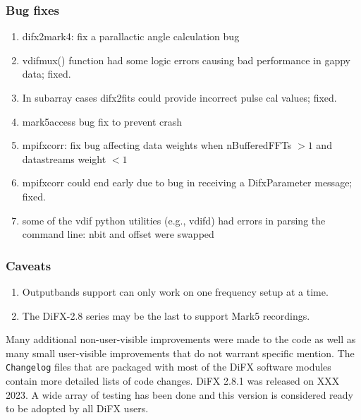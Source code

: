 \subsubsection{Bug fixes}
\begin{enumerate}
\item difx2mark4: fix a parallactic angle calculation bug
\item vdifmux() function had some logic errors causing bad performance in gappy data; fixed.
\item In subarray cases difx2fits could provide incorrect pulse cal values; fixed.
\item mark5access bug fix to prevent crash
\item mpifxcorr: fix bug affecting data weights when nBufferedFFTs $> 1$ and datastreams weight $< 1$
\item mpifxcorr could end early due to bug in receiving a DifxParameter message; fixed.
\item some of the vdif python utilities (e.g., vdifd) had errors in parsing the command line: nbit and offset were swapped
\end{enumerate}

\subsubsection{Caveats}
\begin{enumerate}
\item Outputbands support can only work on one frequency setup at a time.
\item The DiFX-2.8 series may be the last to support Mark5 recordings. 
\end{enumerate}

Many additional non-user-visible improvements were made to the code as well as many small user-visible improvements that do not warrant specific mention.
The {\tt Changelog} files that are packaged with most of the DiFX software modules contain more detailed lists of code changes.
DiFX 2.8.1 was released on XXX 2023.
A wide array of testing has been done and this version is considered ready to be adopted by all DiFX users.


